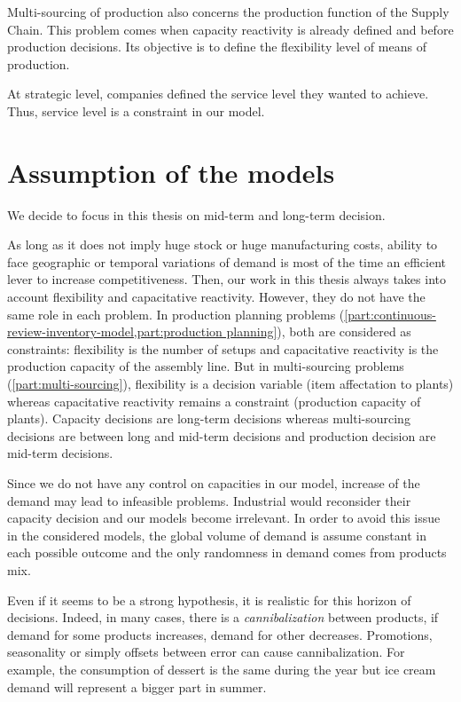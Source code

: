 Multi-sourcing of production also concerns the production function of the Supply Chain.
This problem comes when capacity reactivity is already defined and before production decisions.
Its objective is to define the flexibility level of means of production.


At strategic level, companies defined the service level they wanted to achieve.
Thus, service level is a constraint in our model.



\section{Assumption of the models}


We decide to focus in this thesis on mid-term and long-term decision.


As long as it does not imply huge stock or huge manufacturing costs, ability to face geographic or temporal variations of demand is most of the time an efficient lever to increase competitiveness.
Then, our work in this thesis always takes into account flexibility and capacitative reactivity.
However, they do not have the same role in each problem.
In production planning problems (\cref{part:continuous-review-inventory-model,part:production planning}), both are considered as constraints: flexibility is the number of setups and capacitative reactivity is the production capacity of the assembly line.
But in multi-sourcing problems (\cref{part:multi-sourcing}), flexibility is a decision variable (item affectation to plants) whereas capacitative reactivity remains a constraint (production capacity of plants).
Capacity decisions are long-term decisions whereas multi-sourcing decisions are between long and mid-term decisions and production decision are mid-term decisions.


Since we do not have any control on capacities in our model, increase of the demand may lead to infeasible problems.
Industrial would reconsider their capacity decision and our models become irrelevant.
In order to avoid this issue in the considered models, the global volume of demand is assume constant in each possible outcome and the only randomness in demand comes from products mix.


Even if it seems to be a strong hypothesis, it is realistic for this horizon of decisions.
Indeed, in many cases, there is a \emph{cannibalization} between products, \ie if demand for some products increases, demand for other decreases.
Promotions, seasonality or simply offsets between error can cause cannibalization.
For example, the consumption of dessert is the same during the year but ice cream demand will represent a bigger part in summer.






